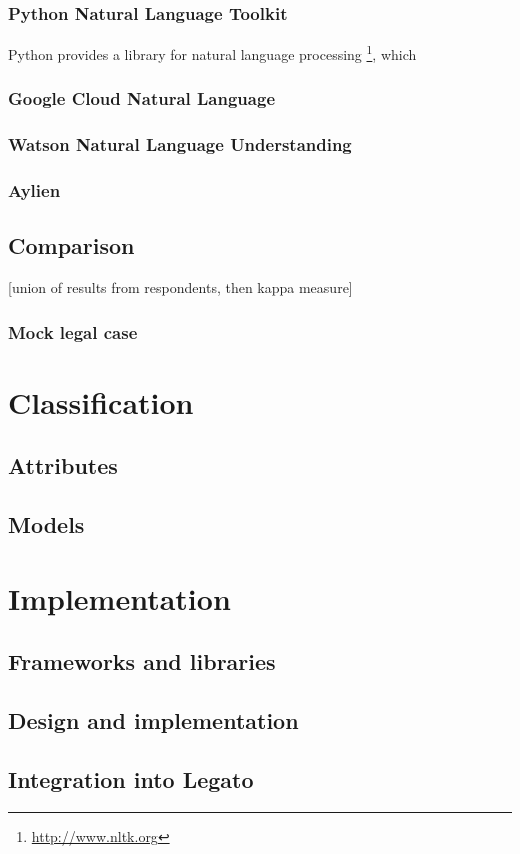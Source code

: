 \documentclass[
  digital, %
  table,   %
  lof,     %
  lot,     %
]{fithesis3}
\begin{document}
\subsection{Python Natural Language Toolkit}
Python provides a library for natural language processing \footnote{\url{http://www.nltk.org}}, which 
\subsection{Google Cloud Natural Language}
\subsection{Watson Natural Language Understanding}
\subsection{Aylien}

\section{Comparison}
[union of results from respondents, then kappa measure]
\subsection{Mock legal case}
\chapter{Classification}
\section{Attributes}
\section{Models}

\chapter{Implementation}
\section{Frameworks and libraries}
\section{Design and implementation}
\section{Integration into Legato}
\end{document}
